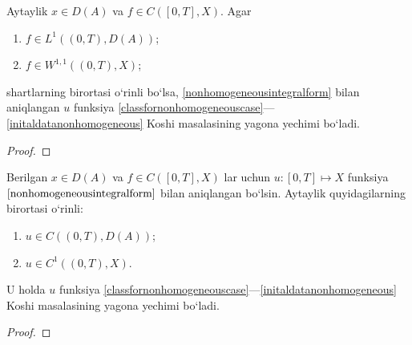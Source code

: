\begin{theorem}
    Aytaylik $x\in D(A)$ va $f\in C\left([0,T], X\right)$. Agar 
    \begin{enumerate}
        \item $f\in L^1\left((0,T), D(A)\right)$;
        \item $f\in W^{1,1}\left((0,T), X\right)$;
    \end{enumerate}
shartlarning birortasi o`rinli bo`lsa, \eqref{nonhomogeneousintegralform} bilan aniqlangan $u$ funksiya \eqref{classfornonhomogeneouscase}---\eqref{initaldatanonhomogeneous} Koshi masalasining yagona yechimi bo`ladi. 
\end{theorem}
\begin{proof}
    
\end{proof}
\begin{corollary}
Berilgan $x\in D(A)$ va $f\in C\left([0,T], X\right)$ lar uchun $u\colon [0,T]\mapsto X$ funksiya $\eqref{nonhomogeneousintegralform}$ bilan aniqlangan bo`lsin. Aytaylik quyidagilarning birortasi o`rinli: 
    \begin{enumerate}
        \item $u\in C\left((0,T), D(A)\right)$;
        \item $u\in C^{1}\left((0,T), X\right)$.
    \end{enumerate}
U holda $u$ funksiya \eqref{classfornonhomogeneouscase}---\eqref{initaldatanonhomogeneous} Koshi masalasining yagona yechimi bo`ladi. 
\end{corollary}

\begin{proof}
    
\end{proof}
